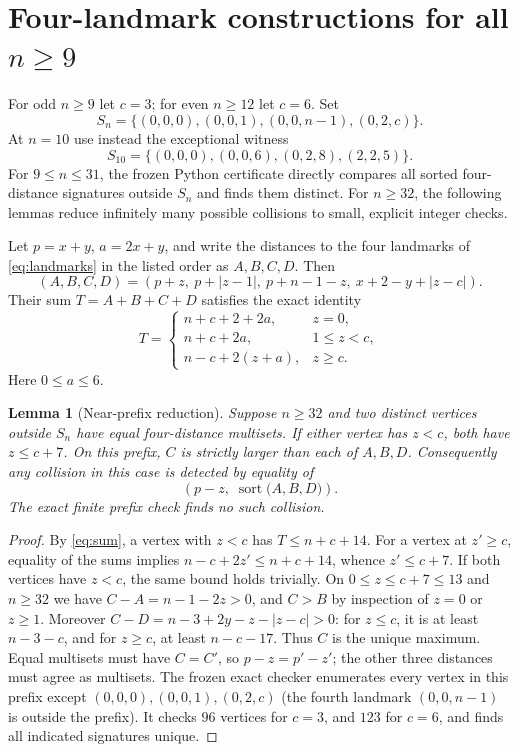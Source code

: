 \documentclass[10pt,a4paper]{article}
\newtheorem{lemma}{Lemma}
\begin{document}
\section{Four-landmark constructions for all \texorpdfstring{$n\ge9$}{n >= 9}}
For odd $n\ge9$ let $c=3$; for even $n\ge12$ let $c=6$. Set
\begin{equation}\label{eq:landmarks}
S_n=\{(0,0,0),(0,0,1),(0,0,n-1),(0,2,c)\}.
\end{equation}
At $n=10$ use instead the exceptional witness
\begin{equation}\label{eq:n10}
 S_{10}=\{(0,0,0),(0,0,6),(0,2,8),(2,2,5)\}.
\end{equation}
For $9\le n\le31$, the frozen Python certificate directly compares
all sorted four-distance signatures outside $S_n$ and finds them distinct.
For $n\ge32$, the following lemmas reduce infinitely many possible
collisions to small, explicit integer checks.

Let $p=x+y$, $a=2x+y$, and write the distances to the four landmarks
of \eqref{eq:landmarks} in the listed order as $A,B,C,D$. Then
\begin{equation}\label{eq:distances}
 (A,B,C,D)=(p+z,\ p+|z-1|,\ p+n-1-z,\ x+2-y+|z-c|).
\end{equation}
Their sum $T=A+B+C+D$ satisfies the exact identity
\begin{equation}\label{eq:sum}
 T=\begin{cases}
 n+c+2+2a,&z=0,\\
 n+c+2a,&1\le z<c,\\
 n-c+2(z+a),&z\ge c.
 \end{cases}
\end{equation}
Here $0\le a\le6$.

\begin{lemma}[Near-prefix reduction]\label{lem:prefix}
Suppose $n\ge32$ and two distinct vertices outside $S_n$ have equal
four-distance multisets. If either vertex has $z<c$, both have
$z\le c+7$.
On this prefix, $C$ is strictly larger than each of $A,B,D$.
Consequently any collision in this case is detected by equality of
\[
 \left(p-z,\;\operatorname{sort}\bigl(A,B,D\bigr)\right).
\]
The exact finite prefix check finds no such collision.
\end{lemma}
\begin{proof}
By \eqref{eq:sum}, a vertex with $z<c$ has $T\le n+c+14$.
For a vertex at $z'\ge c$, equality of the sums implies
$n-c+2z'\le n+c+14$, whence $z'\le c+7$.
If both vertices have $z<c$, the same bound holds trivially.
On $0\le z\le c+7\le13$ and $n\ge32$ we have
$C-A=n-1-2z>0$, and $C>B$ by inspection of $z=0$ or $z\ge1$.
Moreover
$C-D=n-3+2y-z-|z-c|>0$: for $z\le c$, it is at least
$n-3-c$, and for $z\ge c$, at least $n-c-17$.
Thus $C$ is the unique maximum. Equal multisets must have $C=C'$,
so $p-z=p'-z'$; the other three distances must agree as multisets.
The frozen exact checker enumerates every vertex in this prefix except
$(0,0,0),(0,0,1),(0,2,c)$ (the fourth landmark $(0,0,n-1)$ is
outside the prefix). It checks $96$ vertices for $c=3$, and $123$ for
$c=6$, and finds all indicated signatures unique.
\end{proof}
\end{document}
